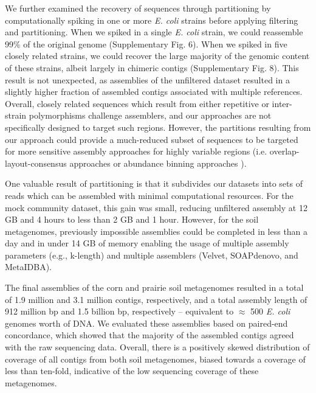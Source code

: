 \documentclass{nature}%
\begin{document}
We further examined the recovery of sequences through partitioning by
computationally spiking in one or more \emph{E. coli} strains before
applying filtering and partitioning.  When we spiked in a single
\emph{E. coli} strain, we could reassemble 99\% of the original genome
(Supplementary Fig. 6).  When we spiked in five closely related strains,
we could recover the large majority of the genomic
content of these strains, albeit largely in chimeric contigs (Supplementary
Fig. 8).  This result is not unexpected, as
assemblies of the unfiltered dataset resulted in a slightly higher
fraction of assembled contigs associated with multiple references.
Overall, closely related sequences which result from either repetitive
or inter-strain polymorphisms challenge assemblers, and our
approaches are not specifically designed to target such regions.
However, the partitions resulting from our approach could provide a 
much-reduced subset of sequences to be
targeted for more sensitive assembly approaches for highly variable regions
(i.e. overlap-layout-consensus approaches or abundance binning
approaches \cite{Sharon:2012kx}).

One valuable result of partitioning is that it subdivides our datasets
into sets of reads which can be assembled with minimal
computational resources.  For the mock community dataset, this gain
was small, reducing unfiltered assembly at 12 GB and 4 hours to less
than 2 GB and 1 hour.  However, for the soil metagenomes, previously
impossible assemblies could be completed in less than a day and in
under 14 GB of memory enabling the usage of multiple assembly
parameters (e.g., k-length) and multiple assemblers (Velvet,
SOAPdenovo, and MetaIDBA).


The final assemblies of the corn and prairie soil metagenomes resulted
in a total of 1.9 million and 3.1 million contigs, respectively, and a
total assembly length of 912 million bp and 1.5 billion bp,
respectively -- equivalent to $\approx$ 500 \emph{E. coli} genomes worth of DNA.  We evaluated these assemblies based on paired-end concordance, which showed that the majority of the assembled contigs agreed with the raw sequencing data.  Overall,
there is a positively skewed distribution of coverage of all contigs
from both soil metagenomes, biased towards a coverage of less than
ten-fold, indicative of the low sequencing coverage of these
metagenomes.
\end{document}

